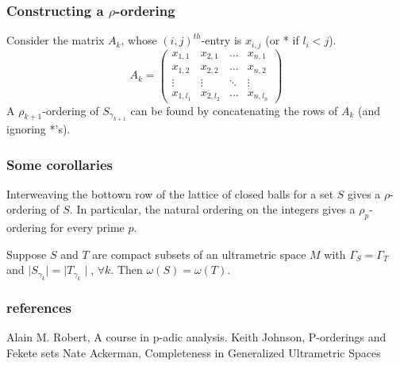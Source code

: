 \documentclass{beamer}
\theoremstyle{definition}
\begin{document}
\begin{frame}
\frametitle{Constructing a $\rho$-ordering}
Consider the matrix $A_k$, whose $(i,j)^{th}$-entry is $x_{i,j}$ (or * if $l_i < j$).
\[A_k=
 \begin{pmatrix}
  x_{1,1} & x_{2,1} & \ldots  &x_{n,1} \\
  x_{1,2} & x_{2,2} &\ldots &x_{n,2} \\
  \vdots & \vdots & \ddots & \vdots \\
  x_{1,l_1} & x_{2,l_2} & \ldots &x_{n,l_n}
 \end{pmatrix}
\]
\pause
 A $\rho_{k+1}$-ordering of $S_{\gamma_{k+1}}$ can be found by concatenating the rows of $A_k$ (and ignoring *'s).
\end{frame}

\begin{frame}
\frametitle{Some corollaries}
\begin{corollary}
Interweaving the bottown row of the lattice of closed balls for a set $S$ gives a $\rho$-ordering of $S$. In particular, the natural ordering on the integers gives a $\rho_p$-ordering for every prime $p$. 

\end{corollary}

\begin{corollary}
Suppose $S$ and $T$ are compact subsets of an ultrametric space $M$ with $\Gamma_S = \Gamma_T$ and $\mid S_{\gamma_k}\mid =\mid T_{\gamma_k}\mid$, $\forall k$. Then $\omega(S) = \omega(T)$. 
\end{corollary}
\end{frame}



\begin{frame}
\frametitle{references}
\begin{thebibliography}{1}
 Alain M. Robert, A course in p-adic analysis.
 Keith Johnson, P-orderings and Fekete sets
 Nate Ackerman,  Completeness in Generalized Ultrametric Spaces
\end{thebibliography}
\end{frame}
\end{document}
